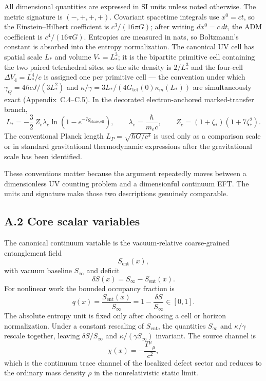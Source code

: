 \documentclass[11pt]{article}
\begin{document}
All dimensional quantities are expressed in SI units unless noted otherwise. The metric signature is $(-,+,+,+)$. Covariant spacetime integrals use $x^0=ct$, so the Einstein--Hilbert coefficient is $c^3/(16\pi G)$; after writing $dx^0=c\,dt$, the ADM coefficient is $c^4/(16\pi G)$. Entropies are measured in nats, so Boltzmann's constant is absorbed into the entropy normalization. The canonical UV cell has spatial scale $L_*$ and volume $V_*=L_*^3$; it is the bipartite primitive cell containing the two paired tetrahedral sites, so the site density is $2/L_*^3$ and the four-cell $\Delta V_4=L_*^4/c$ is assigned one per primitive cell --- the convention under which $\gamma_Q=4\hbar cJ/(3L_*^2)$ and $\kappa/\gamma=3L_*/(4G_{\mathrm{tet}}(0)\kappa_m(L_*))$ are simultaneously exact (Appendix~C.4--C.5). In the decorated electron-anchored marked-transfer branch,
\[
L_*=-\frac32\,Z_e\lambda_e\ln\!\left(1-e^{-7g_{\mathrm{share,eff}}}\right),
\qquad
\lambda_e=\frac{\hbar}{m_ec},
\qquad
Z_e=(1+\zeta_*)(1+7\zeta_*^2).
\]
The conventional Planck length $L_P=\sqrt{\hbar G/c^3}$ is used only as a comparison scale or in standard gravitational thermodynamic expressions after the gravitational scale has been identified.

These conventions matter because the argument repeatedly moves between a dimensionless UV counting problem and a dimensionful continuum EFT. The units and signature make those two descriptions genuinely comparable.

\subsection*{A.2 Core scalar variables}

The canonical continuum variable is the vacuum-relative coarse-grained entanglement field
\[
S_{\mathrm{ent}}(x),
\]
with vacuum baseline $S_\infty$ and deficit
\[
\delta S(x)=S_\infty-S_{\mathrm{ent}}(x).
\]
For nonlinear work the bounded occupancy fraction is
\[
q(x)=\frac{S_{\mathrm{ent}}(x)}{S_\infty}=1-\frac{\delta S}{S_\infty}\in[0,1].
\]
The absolute entropy unit is fixed only after choosing a cell or horizon normalization. Under a constant rescaling of $S_{\mathrm{ent}}$, the quantities $S_\infty$ and $\kappa/\gamma$ rescale together, leaving $\delta S/S_\infty$ and $\kappa/(\gamma S_\infty)$ invariant.
The source channel is
\[
\chi(x)=-\frac{T^\mu{}_\mu}{c^2},
\]
which is the continuum trace channel of the localized defect sector and reduces to the ordinary mass density $\rho$ in the nonrelativistic static limit.
\end{document}
